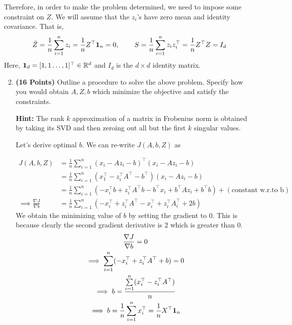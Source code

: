 \documentclass[a4paper]{article}
\newcommand*{\one}{{\bf 1}}
\newcommand{\Zbar}{\bar{Z}}
\theoremstyle{definition}
\newcommand{\RR}{\mathbb{R}}
\newenvironment{soln}{
    \leavevmode\color{blue}\ignorespaces
}{}
\begin{document}
Therefore, in order to make the problem determined, we need to impose some
constraint on $Z$. We will assume that the $z_i$'s have zero mean and identity covariance.
That is,
\begin{align*}
\Zbar = \frac{1}{n} \sum_{i=1}^n z_i =\frac{1}{n} Z^\top {\bf 1}_n = 0, \hspace{0.3in} 
S = \frac{1}{n} \sum_{i=1}^n z_i z_i^\top 
= \frac{1}{n} Z^\top Z
= I_d
\end{align*}
Here, ${\bf 1}_d = [1, 1 \dots, 1]^\top \in\RR^d$ and $I_d$  is the $d\times d$ identity matrix.

\begin{enumerate}
\setcounter{enumi}{1}
\item \textbf{(16 Points)}
Outline a procedure to solve the above problem. Specify how you
would obtain $A, Z, b$ which minimize the objective and satisfy the constraints.

\textbf{Hint: }The rank $k$ approximation of a matrix in Frobenius norm is obtained by
taking its SVD and then zeroing out all but the first $k$ singular values.

\begin{soln}
    Let's derive optimal $b$. We can re-write $J(A, b, Z)$ as

    \begin{align*}
        J(A, b, Z) &= \frac{1}{n} \sum\limits_{i = 1}^{n} (x_i - A z_i - b)^\top (x_i - A z_i -b) \\
        &= \frac{1}{n} \sum\limits_{i = 1}^{n} (x_1^\top - z_i^\top A^\top - b^\top)(x_i -A z_i - b) \\
        &= \frac{1}{n} \sum\limits_{i = 1}^{n} (-x_i^\top b + z_i^\top A^\top b - b^\top x_i + b^\top A z_i + b^\top b) + (\text{constant w.r.to b}) \\
        \implies \frac{\nabla J}{\nabla b} &= \frac{1}{n} \sum\limits_{i = 1}^{n} (-x_i^\top + z_i^\top A^\top - x_i^\top + z_i^\top A^\top_i + 2b)
    \end{align*}
    We obtain the minimizing value of $b$ by setting the gradient to $0$. This is because clearly the second gradient derivative is $2$ which is greater than $0$.
    \begin{gather*}
        \frac{\nabla J}{\nabla b} = 0 \\
        \implies \sum\limits_{i = 1}^{n} (-x_i^\top + z_i^\top A^\top + b) = 0 \\
        \implies b = \frac{\sum\limits_{i = 1}^{n} (x_i^\top - z_i^\top A^\top)}{n} \\
        \implies b = \frac{1}{n} \sum\limits_{i = 1}^{n} x_i^\top = \frac{1}{n} X^\top \one_n
    \end{gather*}


\end{soln}
\end{enumerate}
\end{document}
